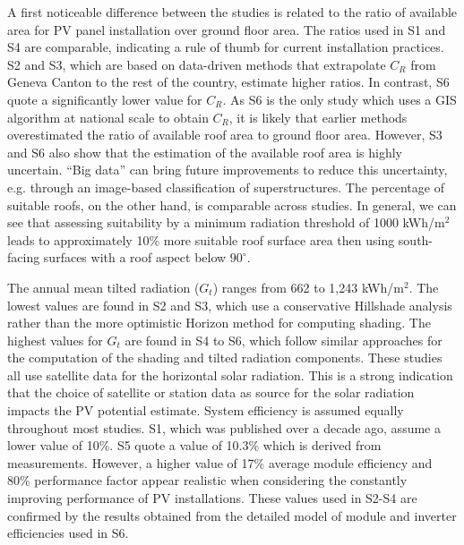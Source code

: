 A first noticeable difference between the studies is related to the ratio of available area for PV panel installation over ground floor area. The ratios used in S1 and S4 are comparable, indicating a rule of thumb for current installation practices. S2 and S3, which are based on data-driven methods that extrapolate $C_R$ from Geneva Canton to the rest of the country, estimate higher ratios. In contrast, S6 quote a significantly lower value for $C_R$. As S6 is the only study which uses a GIS algorithm at national scale to obtain $C_R$, it is likely that earlier methods overestimated the ratio of available roof area to ground floor area. However, S3 and S6 also show that the estimation of the available roof area is highly uncertain. “Big data” can bring future improvements to reduce this uncertainty, e.g. through an image-based classification of superstructures. The percentage of suitable roofs, on the other hand, is comparable across studies. In general, we can see that assessing suitability by a minimum radiation threshold of 1000 kWh/m$^2$ leads to approximately 10\% more suitable roof surface area then using south-facing surfaces with a roof aspect below $90^\circ$. 

The annual mean tilted radiation ($G_t$) ranges from 662 to 1,243 kWh/m$^2$. The lowest values are found in S2 and S3, which use a conservative Hillshade analysis rather than the more optimistic Horizon method for computing shading. The highest values for $G_t$ are found in S4 to S6, which follow similar approaches for the computation of the shading and tilted radiation components. These studies all use satellite data for the horizontal solar radiation. This is a strong indication that the choice of satellite or station data as source for the solar radiation impacts the PV potential estimate. System efficiency is assumed equally throughout most studies. S1, which was published over a decade ago, assume a lower value of 10\%. S5 quote a value of 10.3\% which is derived from measurements. However, a higher value of 17\% average module efficiency and 80\% performance factor appear realistic when considering the constantly improving performance of PV installations. These values used in S2-S4 are confirmed by the results obtained from the detailed model of module and inverter efficiencies used in S6.

